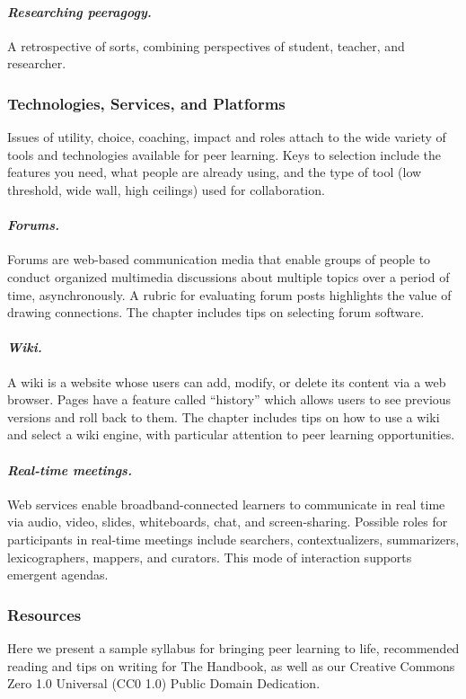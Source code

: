 \paragraph{\emph{Researching peeragogy.}} A retrospective of sorts, combining perspectives of student, teacher, and researcher.

\subsubsection{Technologies, Services, and Platforms}

\noindent Issues of utility, choice, coaching, impact and roles attach
to the wide variety of tools and technologies available for peer
learning. Keys to selection include the features you need, what people
are already using, and the type of tool (low threshold, wide wall,
high ceilings) used for collaboration.

\paragraph{\emph{Forums.}} Forums are web-based communication media
that enable groups of people to conduct organized multimedia discussions
about multiple topics over a period of time, asynchronously. A rubric
for evaluating forum posts highlights the value of drawing connections.
The chapter includes tips on selecting forum software.

\paragraph{\emph{Wiki.}} A
wiki is a website whose users can add, modify, or delete its content via
a web browser. Pages have a feature called ``history'' which allows
users to see previous versions and roll back to them. The chapter
includes tips on how to use a wiki and select a wiki engine, with
particular attention to peer learning opportunities.

 \paragraph{\emph{Real-time meetings.}} Web services enable broadband-connected
learners to communicate in real time via audio, video, slides,
whiteboards, chat, and screen-sharing. Possible roles for participants
in real-time meetings include searchers, contextualizers, summarizers,
lexicographers, mappers, and curators. This mode of interaction
supports emergent agendas.

\subsubsection{Resources}

\noindent Here we present a sample syllabus for bringing peer learning
to life, recommended reading and tips on writing for The Handbook, as
well as our Creative Commons Zero 1.0 Universal (CC0 1.0) Public
Domain Dedication.
